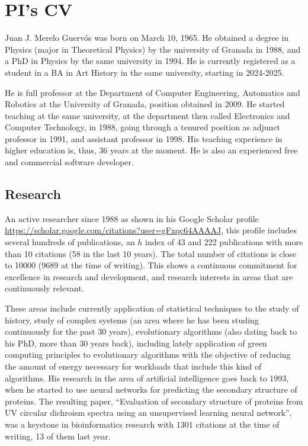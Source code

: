 \documentclass[a4paper,12pt]{article}
\begin{document}
\newpage

\section{PI's CV}

Juan J. Merelo Guervós was born on March 10, 1965. He obtained a degree in Physics (major in Theoretical Physics) by the university of Granada in 1988, and a PhD in Physics by the same university in 1994. He is currently registered as a student in a BA in Art History in the same university, starting in 2024-2025.

He is full professor at the Department of Computer Engineering, Automatics and
Robotics at the University of Granada, position obtained in 2009. He started
teaching at the same university, at the department then called Electronics and
Computer Technology, in 1988, going through a tenured position as adjunct
professor in 1991, and assistant professor in 1998. His teaching experience in
higher education is, thus, 36 years at the moment. He is also an experienced
free and commercial software developer.


\subsection{Research}

An active researcher since 1988 as shown in his Google Scholar profile \url{https://scholar.google.com/citations?user=gFxqc64AAAAJ}, this profile includes several hundreds of publications, an $h$ index of 43 and 222 publications with more than 10 citations (58 in the last 10 years). The total number of citations is close to 10000 (9689 at the time of writing). This shows a continuous commitment for excellence in research and development, and research interests in areas that are continuously relevant.

These areas include currently application of statistical techniques to the study of history, study of complex systems (an area where he has been studing continuously for the past 30 years), evolutionary algorithms (also dating back to his PhD, more than 30 years back), including lately application of green computing principles to evolutionary algorithms with the objective of reducing the amount of energy necessary for workloads that include this kind of algorithms. His research in the area of artificial intelligence goes back to 1993, when he started to use neural networks for predicting the secondary structure of proteins. The resulting paper, ``Evaluation of secondary structure of proteins from UV circular dichroism spectra using an unsupervised learning neural network'', was a keystone in bioinformatics research with 1301 citations at the time of writing, 13 of them last year.
\end{document}
